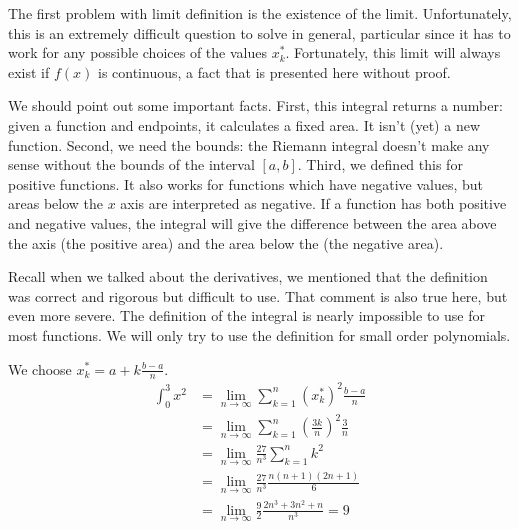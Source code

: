 \documentclass[fleqn]{report}
\begin{document}
The first problem with limit definition is
the existence of the limit. Unfortunately, this is an extremely
difficult question to solve in general, particular since it
has to work for any possible choices of the values $x_k^*$.
Fortunately, this limit will always exist if $f(x)$ is
continuous, a fact that is presented here without proof.

We should point out some important facts. First, this
integral returns a number: given a function and endpoints, it
calculates a fixed area. It isn't (yet) a new function.
Second, we need the bounds: the Riemann integral doesn't make
any sense without the bounds of the interval $[a,b]$. Third,
we defined this for positive functions. It also works for
functions which have negative values, but areas below the $x$ axis
are interpreted as negative. If a function has both positive
and negative values, the integral will give the difference between
the area above the axis (the positive area) and the area below
the (the negative area).

Recall when we talked about the derivatives, we mentioned that
the definition was correct and rigorous but difficult to use.
That comment is also true here, but even more severe. The
definition of the integral is nearly impossible to use for
most functions. We will only try to use the definition for
small order polynomials.

\begin{example} 
We choose $x_k^* = a + k \frac{b-a}{n}$.
\begin{align*}
\int_0^3 x^2 
& = \lim_{n \rightarrow \infty} \sum_{k=1}^n (x^*_k)^2
\frac{b-a}{n} \\
& = \lim_{n \rightarrow \infty} \sum_{k=1}^n \left( \frac{3k}{n}
\right)^2 \frac{3}{n} \\
& = \lim_{n \rightarrow \infty} \frac{27}{n^3} \sum_{k=1}^n k^2 \\
& = \lim_{n \rightarrow \infty} \frac{27}{n^3} \frac{n(n+1)(2n+1)}{6} \\
& = \lim_{n \rightarrow \infty} \frac{9}{2}
\frac{2n^3+3n^2+n}{n^3} = 9
\end{align*}
\end{example}
\end{document}
